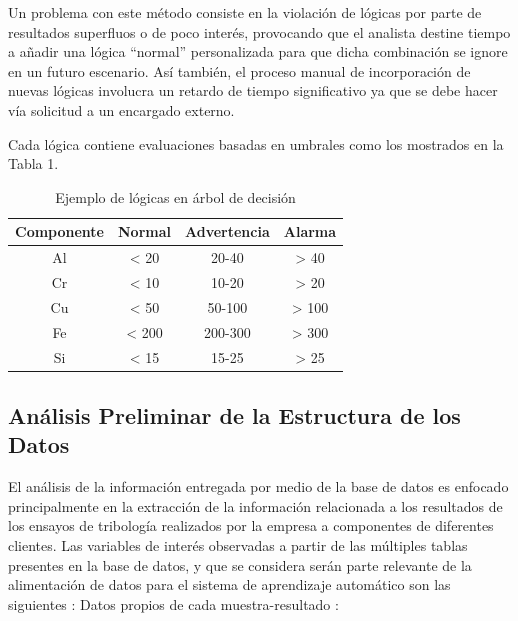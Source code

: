 \documentclass{article}
\begin{document}
Un problema con este método consiste en la violación de lógicas por parte de resultados superfluos o de poco interés, provocando que el analista destine tiempo a añadir una lógica “normal” personalizada para que dicha combinación se ignore en un futuro escenario. Así también, el proceso manual de incorporación de nuevas lógicas involucra un retardo de tiempo significativo ya que se debe hacer vía solicitud a un encargado externo.

Cada lógica contiene evaluaciones basadas en umbrales como los mostrados en la Tabla 1.

\begin{table}[!htbp]\centering
\begin{tabular}{|c|c|c|c|}
\hline 
Componente & Normal & Advertencia & Alarma \\ 
\hline 
Al & < 20 & 20-40 & > 40 \\ 
\hline 
Cr & < 10 & 10-20 & > 20 \\ 
\hline 
Cu & < 50 & 50-100 & > 100 \\ 
\hline 
Fe & < 200 & 200-300 & > 300 \\ 
\hline 
Si & < 15 & 15-25 & > 25 \\ 
\hline 
\end{tabular} \label{tab:limites}
\caption{Ejemplo de l\'ogicas en \'arbol de decisi\'on}
\end{table}


\subsection{Análisis Preliminar de la Estructura de los Datos}

El análisis de la información entregada por medio de la base de datos es enfocado principalmente en la extracción de la información relacionada a los resultados de los ensayos de tribología realizados por la empresa a componentes de diferentes clientes. Las variables de interés observadas a partir de las múltiples tablas presentes en la base de datos, y que se considera ser\'an parte relevante de la alimentaci\'on de datos para el sistema de aprendizaje automático son las siguientes :
\newline \newline
Datos propios de cada muestra-resultado :
\end{document}

